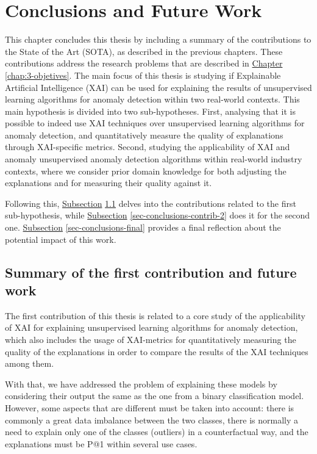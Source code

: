 \chapter{Conclusions and Future Work}\label{ch-conclusions}
This chapter concludes this thesis by including a summary of the contributions to the State of the Art (SOTA), as described in the previous chapters. These contributions address the research problems that are described in \hyperref[chap:3-objetives]{Chapter} \ref{chap:3-objetives}. The main focus of this thesis is studying if Explainable Artificial Intelligence (XAI) can be used for explaining the results of unsupervised learning algorithms for anomaly detection within two real-world contexts. This main hypothesis is divided into two sub-hypotheses. First, analysing that it is possible to indeed use XAI techniques over unsupervised learning algorithms for anomaly detection, and quantitatively measure the quality of explanations through XAI-specific metrics. Second, studying the applicability of XAI and anomaly unsupervised anomaly detection algorithms within real-world industry contexts, where we consider prior domain knowledge for both adjusting the explanations and for measuring their quality against it. 

Following this, \hyperref[sec-conclusions-contrib-1]{Subsection} \ref{sec-conclusions-contrib-1} delves into the contributions related to the first sub-hypothesis, while  \hyperref[sec-conclusions-contrib-2]{Subsection} \ref{sec-conclusions-contrib-2} does it for the second one. \hyperref[sec-conclusions-final]{Subsection} \ref{sec-conclusions-final} provides a final reflection about the potential impact of this work.

\section{Summary of the first contribution and future work}\label{sec-conclusions-contrib-1}
The first contribution of this thesis is related to a core study of the applicability of XAI for explaining unsupervised learning algorithms for anomaly detection, which also includes the usage of XAI-metrics for quantitatively measuring the quality of the explanations in order to compare the results of the XAI techniques among them. 

With that, we have addressed the problem of explaining these models by considering their output the same as the one from a binary classification model. However, some aspects that are different must be taken into account: there is commonly a great data imbalance between the two classes, there is normally a need to explain only one of the classes (outliers) in a counterfactual way, and the explanations must be P@1 within several use cases.

